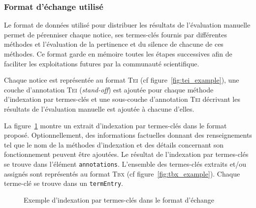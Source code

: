       \subsubsection{Format d'échange utilisé}
      \label{subsubsec:main-automatic_evaluation_of_keyphrase_annotation-methodology-data_format-final_format}
        Le format de données utilisé pour distribuer les résultats de
        l'évaluation manuelle permet de pérenniser chaque notice, ses
        termes-clés fournis par différentes méthodes et l'évaluation de la
        pertinence et du silence de chacune de ces méthodes. Ce format garde en
        mémoire toutes les étapes successives afin de faciliter les
        exploitations futures par la communauté scientifique.

        Chaque notice est représentée au format \textsc{Tei} (cf
        figure~\ref{fig:tei_example}), une couche d'annotation
        \textsc{Tei} (\textit{stand-off}) est ajoutée pour chaque méthode
        d'indexation par termes-clés et une sous-couche d'annotation
        \textsc{Tei} décrivant les résultats de l'évaluation manuelle est
        ajoutée à chacune d'elles.

        La figure~\ref{fig:tei_tbx_keyphrase_example} montre un extrait
        d'indexation par termes-clés dans le format proposé. Optionnellement,
        des informations factuelles donnant des renseignements tel que le nom de
        la méthodes d'indexation et des détails concernant son fonctionnement
        peuvent être ajoutées. Le résultat de l'indexation par termes-clés se
        trouve dans l'élément \texttt{annotations}. L'ensemble des termes-clés
        extraits et/ou assignés sont représentés au format \textsc{Tbx} (cf
        figure~\ref{fig:tbx_example}). Chaque terme-clé se trouve dans un
        \texttt{termEntry}.
        \begin{figure}[h!]
          \setlstxml
          
          \caption{Exemple d'indexation par termes-clés dans le format d'échange
                   \label{fig:tei_tbx_keyphrase_example}}
        \end{figure}

